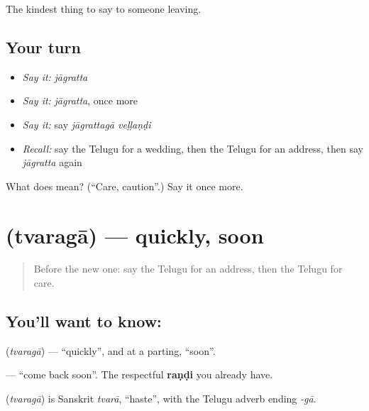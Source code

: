 \begin{grammarlens}[title={What you've built}]
The kindest thing to say to someone leaving.
\end{grammarlens}

\subsection*{Your turn}
\begin{itemize}
\raggedright
  \item \emph{Say it:} \emph{jāgratta}
  \item \emph{Say it:} \emph{jāgratta}, once more
  \item \emph{Say it:} say \emph{jāgrattagā veḷḷaṇḍi}
  \item \emph{Recall:} say the Telugu for a wedding, then the Telugu for an address, then say \emph{jāgratta} again
\end{itemize}

\begin{tcolorbox}[breakable,colback=teal!4,colframe=teal!35!black,title={Before you move on}]
What does  mean? (\textquotedblleft{}Care, caution\textquotedblright{}.) Say it once more.
\end{tcolorbox}
\section[\texorpdfstring{\te{త్వరగా} (tvaragā)}{త్వరగా (tvaragā)}]{ (tvaragā) — quickly, soon}

\label{lesson:TE-C90-soon}



\begin{quote}
Before the new one: say the Telugu for an address, then the Telugu for care.
\end{quote}

\subsection*{You'll want to know: }
\textbf{} (\emph{tvaragā}) — \textquotedblleft{}quickly\textquotedblright{}, and at a parting, \textquotedblleft{}soon\textquotedblright{}.

\textbf{ } — \textquotedblleft{}come back soon\textquotedblright{}. The respectful \textbf{raṇḍi} you already have.

\begin{cousinweb}
\textbf{} (\emph{tvaragā}) is Sanskrit \emph{tvarā}, \textquotedblleft{}haste\textquotedblright{}, with the Telugu adverb ending \emph{-gā}.
\end{cousinweb}

